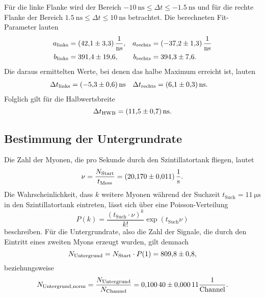 Für die linke Flanke wird der Bereich $\SI{-10}{\nano\second} \leq \Delta t \leq \SI{-1.5}{\ns}$ und für die rechte Flanke der Bereich $\SI{1.5}{\ns} \leq \Delta t \leq \SI{10}{\ns}$ betrachtet. Die berechneten Fit-Parameter lauten
\begin{align*}
  a_\mathrm{links} &= \SI{42.1 \pm 3.3}{\per\ns}, & a_\mathrm{rechts} &= \SI{-37.2 \pm 1.3}{\per\ns} \\
  b_\mathrm{links} &= \num{391.4 \pm 19.6}, & b_\mathrm{rechts} &= \num{394.3 \pm 7.6}.
\end{align*}
Die daraus ermittelten Werte, bei denen das halbe Maximum erreicht ist, lauten
\begin{align*}
  \Delta t_\mathrm{links} &= \SI{-5.3 \pm 0.6}{\ns} & \Delta t_\mathrm{rechts} &= \SI{6.1 \pm 0.3}{\ns}.
\end{align*}
Folglich gilt für die Halbwertsbreite
\begin{equation*}
  \Delta t_\mathrm{HWB} = \SI{11.5 \pm 0.7}{\ns}.
\end{equation*}

\subsection{Bestimmung der Untergrundrate}
Die Zahl der Myonen, die pro Sekunde durch den Szintillatortank fliegen, lautet
\begin{equation*}
  \nu = \frac{N_\mathrm{Start}}{t_\mathrm{Mess}} = \SI{20.17 \pm 0.011}{\per\second}.
\end{equation*}
Die Wahrscheinlichkeit, dass $k$ weitere Myonen während der Suchzeit $t_\mathrm{Such} = \SI{11}{\micro\second}$ in den Szintillatortank eintreten, lässt sich über eine Poisson-Verteilung
\begin{equation*}
  P(k) = \frac{(t_\mathrm{Such} \cdot \nu)^k}{k!} \exp (t_\mathrm{Such} \nu)
\end{equation*}
beschreiben.
Für die Untergrundrate, also die Zahl der Signale, die durch den Eintritt eines zweiten Myons erzeugt wurden, gilt demnach
\begin{equation*}
  N_\mathrm{Untergrund} = N_\mathrm{Start} \cdot P(1) = \num{809.8 \pm 0.8},
\end{equation*}
beziehungsweise
\begin{equation*}
  N_\mathrm{Untergrund,norm} = \frac{N_\mathrm{Untergrund}}{N_\mathrm{Channel}} = \num{0.1004 \pm 0.00011} \frac{1}{\mathrm{Channel}}.
\end{equation*}

